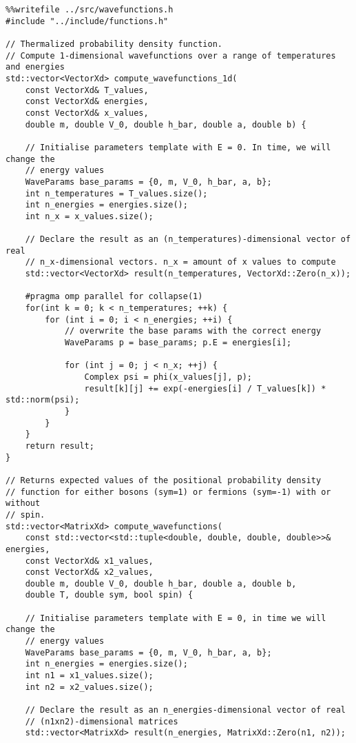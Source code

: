 \documentclass[11pt]{article}
\begin{document}
\begin{verbatim}
%%writefile ../src/wavefunctions.h
#include "../include/functions.h"

// Thermalized probability density function.
// Compute 1-dimensional wavefunctions over a range of temperatures and energies
std::vector<VectorXd> compute_wavefunctions_1d(
    const VectorXd& T_values,
    const VectorXd& energies,
    const VectorXd& x_values,
    double m, double V_0, double h_bar, double a, double b) {

    // Initialise parameters template with E = 0. In time, we will change the
    // energy values
    WaveParams base_params = {0, m, V_0, h_bar, a, b};
    int n_temperatures = T_values.size();
    int n_energies = energies.size();
    int n_x = x_values.size();

    // Declare the result as an (n_temperatures)-dimensional vector of real
    // n_x-dimensional vectors. n_x = amount of x values to compute
    std::vector<VectorXd> result(n_temperatures, VectorXd::Zero(n_x));

    #pragma omp parallel for collapse(1)
    for(int k = 0; k < n_temperatures; ++k) {
        for (int i = 0; i < n_energies; ++i) {
            // overwrite the base params with the correct energy
            WaveParams p = base_params; p.E = energies[i];

            for (int j = 0; j < n_x; ++j) {
                Complex psi = phi(x_values[j], p);
                result[k][j] += exp(-energies[i] / T_values[k]) * std::norm(psi);
            }
        }
    }
    return result;
}

// Returns expected values of the positional probability density
// function for either bosons (sym=1) or fermions (sym=-1) with or without
// spin.
std::vector<MatrixXd> compute_wavefunctions(
    const std::vector<std::tuple<double, double, double, double>>& energies,
    const VectorXd& x1_values,
    const VectorXd& x2_values,
    double m, double V_0, double h_bar, double a, double b,
    double T, double sym, bool spin) {

    // Initialise parameters template with E = 0, in time we will change the
    // energy values
    WaveParams base_params = {0, m, V_0, h_bar, a, b};
    int n_energies = energies.size();
    int n1 = x1_values.size();
    int n2 = x2_values.size();

    // Declare the result as an n_energies-dimensional vector of real
    // (n1xn2)-dimensional matrices
    std::vector<MatrixXd> result(n_energies, MatrixXd::Zero(n1, n2));


\end{verbatim}
\end{document}
